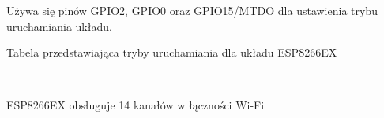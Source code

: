 \documentclass[12pt,a4paper,oneside]{memoir}
\begin{document}
\par Używa się pinów GPIO2, GPIO0 oraz GPIO15/MTDO dla ustawienia trybu uruchamiania układu.
\\[10pt]
\begin{table}[!h]
\centering
{}
	{\tytulyrozdzialow \footnotesize \caption[ESP8266EX - tryby uruchamiania]{Tabela przedstawiająca tryby uruchamiania dla układu ESP8266EX}
	\caption*{\textit{Źródło: \cite{esp8266datasheet}}}}
\end{table}\\
\newpage
\par ESP8266EX obsługuje 14 kanałów w łączności Wi-Fi
\end{document}
